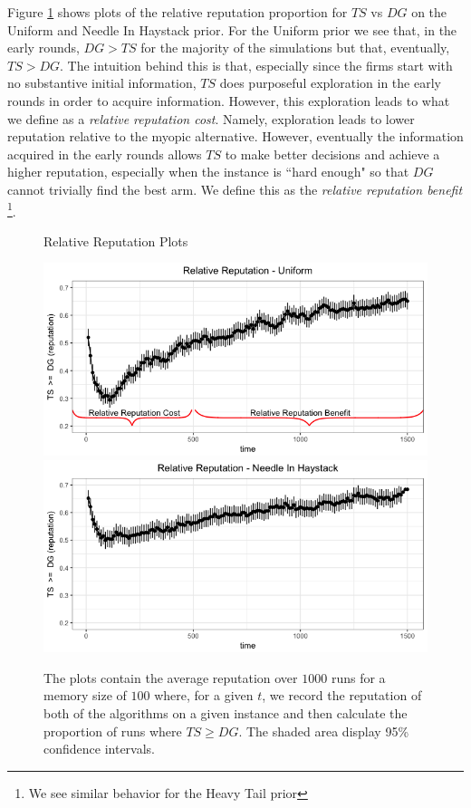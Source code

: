 \documentclass{article}
\theoremstyle{definition}
\begin{document}
Figure \ref{relative_rep_plots} shows plots of the relative reputation proportion for $TS$ vs $DG$ on the Uniform and Needle In Haystack prior. For the Uniform prior we see that, in the early rounds, $DG > TS$ for the majority of the simulations but that, eventually, $TS > DG$. The intuition behind this is that, especially since the firms start with no substantive initial information, $TS$ does purposeful exploration in the early rounds in order to acquire information. However, this exploration leads to what we define as a \textit{relative reputation cost}. Namely, exploration leads to lower reputation relative to the myopic alternative. However, eventually the information acquired in the early rounds allows $TS$ to make better decisions and achieve a higher reputation, especially when the instance is ``hard enough" so that $DG$ cannot trivially find the best arm. We define this as the \textit{relative reputation benefit} \footnote{We see similar behavior for the Heavy Tail prior}.

\begin{figure}
\caption{Relative Reputation Plots}
\includegraphics[scale=0.35]{figures/relative_uniform_annotated_plot}
\includegraphics[scale=0.35]{figures/ts_dg_nih_10_prelim}
\caption*{\tiny{The plots contain the average reputation over $1000$ runs for a memory size of $100$ where, for a given $t$, we record the reputation of both of the algorithms on a given instance and then calculate the proportion of runs where $TS \geq DG$. The shaded area display 95\% confidence intervals.}}
\label{relative_rep_plots}

\end{figure}
\end{document}
